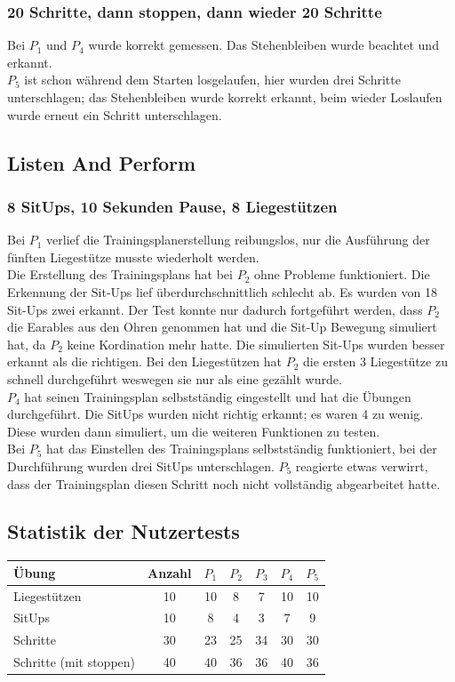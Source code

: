 \documentclass[a4paper,12pt]{article}
\begin{document}
\subsubsection{20 Schritte, dann stoppen, dann wieder 20 Schritte}
Bei  $P_1$ und $P_4$ wurde korrekt gemessen. Das Stehenbleiben wurde beachtet und erkannt.\\
$P_5$ ist schon während dem Starten losgelaufen, hier wurden drei Schritte unterschlagen; das Stehenbleiben wurde korrekt erkannt, beim wieder Loslaufen wurde erneut ein Schritt unterschlagen.\\
\subsection{Listen And Perform}
\subsubsection{8 SitUps, 10 Sekunden Pause, 8 Liegestützen}
Bei $P_1$ verlief die Trainingsplanerstellung reibungslos, nur die Ausführung der fünften Liegestütze musste wiederholt werden.\\
Die Erstellung des Trainingsplans hat bei $P_2$ ohne Probleme funktioniert. Die Erkennung der Sit-Ups lief überdurchschnittlich schlecht ab. Es wurden von 18 Sit-Ups zwei erkannt. Der Test konnte nur dadurch fortgeführt werden, dass $P_2$ die Earables aus den Ohren genommen hat und die Sit-Up Bewegung simuliert hat, da $P_2$ keine Kordination mehr hatte. Die simulierten Sit-Ups wurden besser erkannt als die richtigen. Bei den Liegestützen hat $P_2$ die ersten 3 Liegestütze zu schnell durchgeführt weswegen sie nur als eine gezählt wurde.\\
$P_4$ hat seinen Trainingsplan selbstständig eingestellt und hat die Übungen durchgeführt. Die SitUps wurden nicht richtig erkannt; es waren 4 zu wenig. Diese wurden dann simuliert, um die weiteren Funktionen zu testen.\\
Bei $P_5$ hat das Einstellen des Trainingsplans selbstständig funktioniert, bei der Durchführung wurden drei SitUps unterschlagen. $P_5$ reagierte etwas verwirrt, dass der Trainingsplan diesen Schritt noch nicht vollständig abgearbeitet hatte.
\subsection{Statistik der Nutzertests}
\begin{tabular}{ | l | c | c | c | c | c | c |}
	\hline
	\textbf{Übung} & \textbf{Anzahl} & $P_1$ & $P_2$ & $P_3$ & $P_4$ & $P_5$\\
	\hline
	Liegestützen & 10 & 10 & 8 & 7 & 10 & 10 \\
	\hline
	SitUps & 10 & 8 & 4 & 3 & 7 & 9 \\
	\hline
	Schritte & 30 & 23 &25 & 34 & 30 & 30 \\
	\hline
	Schritte (mit stoppen) & 40 & 40 & 36 & 36 & 40 & 36 \\
	\hline
\end{tabular}\\
\end{document}
